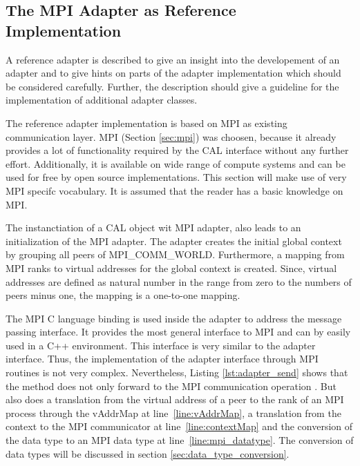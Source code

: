 \subsection{The MPI Adapter as Reference Implementation}
\label{sec:cal_mpi_adapter}

A reference adapter is described to give an insight into the
developement of an adapter and to give hints on parts of the adapter
implementation which should be considered carefully.  Further, the
description should give a guideline for the implementation of
additional adapter classes.

The reference adapter implementation is based on MPI as existing
communication layer.  MPI (Section \ref{sec:mpi}) was choosen,
because it already provides a lot of functionality required by the CAL
interface without any further effort. Additionally, it is available on wide range
of compute systems and can be used for free by open source
implementations. This section will make use of very MPI specifc 
vocabulary. It is assumed that the reader has a basic knowledge
on MPI.

The instanctiation of a CAL object wit MPI adapter, also leads to an
initialization of the MPI adapter. The adapter creates the initial
global context by grouping all peers of MPI\_COMM\_WORLD.
Furthermore, a mapping from MPI ranks to virtual addresses for the global
context is created. Since, virtual addresses are defined as
natural number in the range from zero to the numbers of peers minus one,
the mapping is a one-to-one mapping.

The MPI C language binding is used inside the adapter to address the
message passing interface.  It provides the most general interface to
MPI and can by easily used in a C++ environment.  This interface is
very similar to the adapter interface. Thus, the implementation of the
adapter interface through MPI routines is not very
complex. Nevertheless, Listing \ref{lst:adapter_send} shows that the
 method does not only forward to the MPI
communication operation .  But also does a translation
from the virtual address  of a peer to the rank of an
MPI process through the vAddrMap at line~\ref{line:vAddrMap}, a
translation from the context to the MPI communicator at
line~\ref{line:contextMap} and the conversion of the data type
 to an MPI data type at line~\ref{line:mpi_datatype}.  The
conversion of data types will be discussed in section
\ref{sec:data_type_conversion}.


